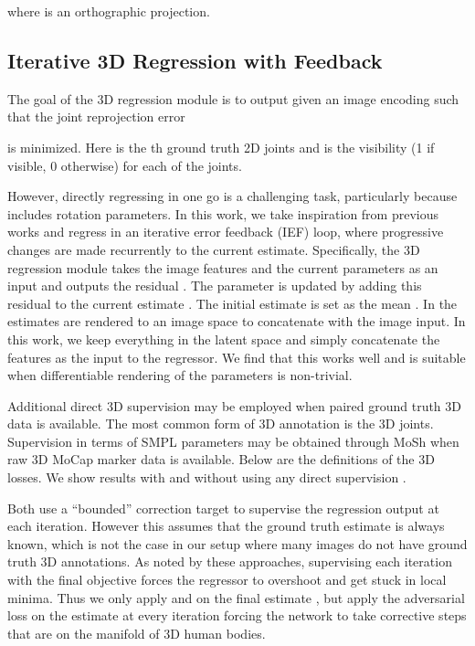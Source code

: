 \documentclass[10pt,twocolumn,letterpaper]{article}
\begin{document}
where  is an orthographic projection.

\subsection{Iterative 3D Regression with Feedback}
The goal of the 3D regression module is to output  given an image encoding  such that the joint reprojection error

 is minimized. Here  is the th ground truth 2D joints and
  is the visibility (1 if visible, 0 otherwise) for each
of the  joints.

However, directly regressing  in one go is a challenging task, particularly
because  includes rotation parameters.
In this work, we take inspiration from previous works
\cite{IEF,dollar2010cascaded,oberweger2015training} and regress  in an iterative error feedback
(IEF) loop, where progressive changes are made recurrently to the current estimate. Specifically,
the 3D regression module takes the image features  and the current
parameters  as an input and outputs the residual . The parameter
is updated by adding this residual to the current estimate . The initial estimate  is set as the mean . 
In \cite{IEF,oberweger2015training} the estimates are rendered to an image space to
concatenate with the image input. In this work, we keep everything in the latent
space and simply concatenate the features  as the input to the
regressor. We find that this works well and is suitable when differentiable
rendering of the parameters is non-trivial.

Additional direct 3D supervision may be employed when paired ground truth 3D
data is available. The most common form of 3D annotation is the 3D
joints. Supervision in terms of SMPL parameters  may be obtained
through MoSh \cite{Mosh,Gul} when raw 3D MoCap marker data is available. Below
are the definitions of the 3D losses. We show results with and without using any direct supervision . 


Both \cite{IEF,oberweger2015training} use a ``bounded'' correction target to
supervise the regression output at each iteration. However this assumes that the ground truth estimate is always
known, which is not the case in our setup where many images do not have ground truth 3D annotations.
As noted by these approaches, supervising each iteration with the final objective forces
the regressor to overshoot and get stuck in local minima. Thus we only apply
 and  on the final estimate , but apply the adversarial loss on the
estimate at every iteration  forcing the network to take corrective steps that
are on the manifold of 3D human bodies. 
\end{document}
